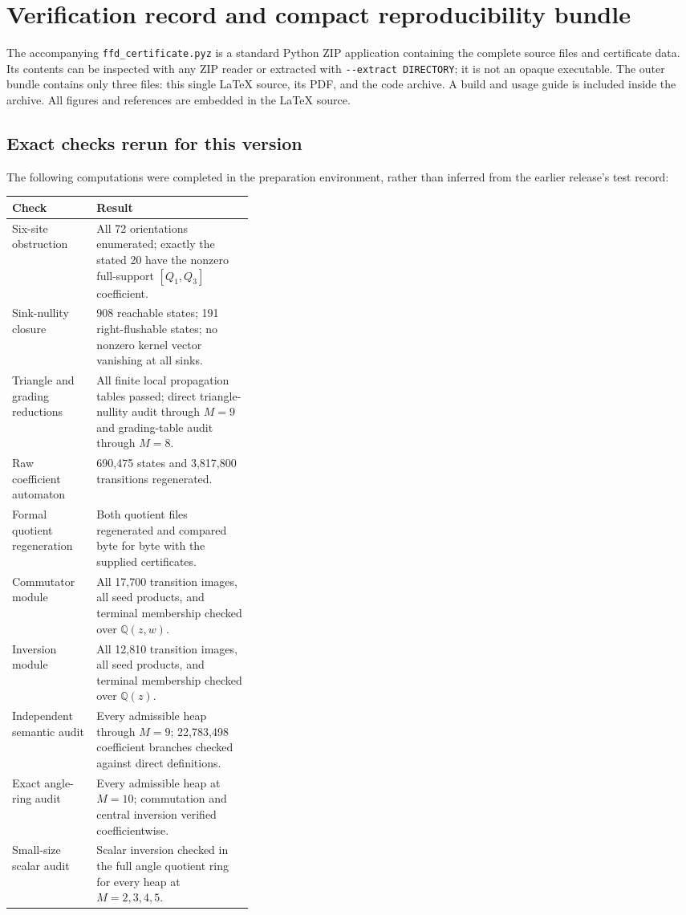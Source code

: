 \documentclass[10pt,letterpaper]{article}
\newcommand{\code}[1]{\nolinkurl{#1}}
\begin{document}
\section{Verification record and compact reproducibility bundle}\label{supp:audit}

The accompanying \code{ffd_certificate.pyz} is a standard Python ZIP application containing the complete source files and certificate data. Its contents can be inspected with any ZIP reader or extracted with \code{--extract DIRECTORY}; it is not an opaque executable. The outer bundle contains only three files: this single \LaTeX{} source, its PDF, and the code archive. A build and usage guide is included inside the archive. All figures and references are embedded in the \LaTeX{} source.

\subsection{Exact checks rerun for this version}
The following computations were completed in the preparation environment, rather than inferred from the earlier release's test record:
\begin{center}
\begin{tabularx}{\linewidth}{@{}p{0.35\linewidth}X@{}}
\toprule
Check & Result\\
\midrule
Six-site obstruction & All 72 orientations enumerated; exactly the stated 20 have the nonzero full-support $[Q_1,Q_3]$ coefficient.\\
Sink-nullity closure & 908 reachable states; 191 right-flushable states; no nonzero kernel vector vanishing at all sinks.\\
Triangle and grading reductions & All finite local propagation tables passed; direct triangle-nullity audit through $M=9$ and grading-table audit through $M=8$.\\
Raw coefficient automaton & 690,475 states and 3,817,800 transitions regenerated.\\
Formal quotient regeneration & Both quotient files regenerated and compared byte for byte with the supplied certificates.\\
Commutator module & All 17,700 transition images, all seed products, and terminal membership checked over $\mathbb Q(z,w)$.\\
Inversion module & All 12,810 transition images, all seed products, and terminal membership checked over $\mathbb Q(z)$.\\
Independent semantic audit & Every admissible heap through $M=9$; 22,783,498 coefficient branches checked against direct definitions.\\
Exact angle-ring audit & Every admissible heap at $M=10$; commutation and central inversion verified coefficientwise.\\
Small-size scalar audit & Scalar inversion checked in the full angle quotient ring for every heap at $M=2,3,4,5$.\\
\bottomrule
\end{tabularx}
\end{center}
\end{document}
